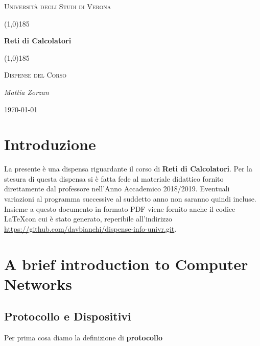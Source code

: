 \documentclass{article}
\begin{document}
    \clearpage

    \begin{titlepage}
        \centering
        \vspace*{\fill}
        {\scshape\LARGE Università degli Studi di Verona \par}
        \vspace{1.5cm}
        \line(1,0){185} \\
        {\huge\bfseries Reti di Calcolatori \par}
        \line(1,0){185} \\
        \vspace{0.5cm}
        {\scshape\LARGE Dispense del Corso \par}
        \vspace{2cm}
        {\Large\itshape Mattia Zorzan \par}
        \vspace{1cm}

        \vspace{5cm}
        \vspace*{\fill}
        {\large \today \par}
    \end{titlepage}
    \thispagestyle{empty}

    \newpage
    \tableofcontents

    \newpage

    \section{Introduzione}
        La presente è una dispensa riguardante il corso di \textbf{Reti di Calcolatori}. Per la stesura di questa dispensa si è fatta fede al materiale didattico fornito direttamente dal professore nell'Anno Accademico 2018/2019. Eventuali variazioni al programma successive al suddetto anno non saranno quindi incluse.\\
        Insieme a questo documento in formato PDF viene fornito anche il codice \LaTeX  con cui è stato generato, reperibile all'indirizzo \url{https://github.com/davbianchi/dispense-info-univr.git}.

\newpage
    \section{A brief introduction to Computer Networks}
        \subsection{Protocollo e Dispositivi}
        Per prima cosa diamo la definizione di \textbf{protocollo}
\end{document}
